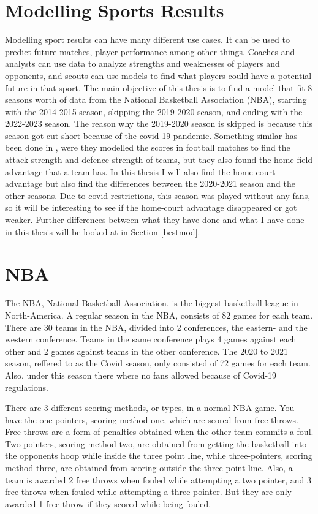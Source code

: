 
\section{Modelling Sports Results}

\noindent Modelling sport results can have many different use cases. It can be used to predict future matches, player performance among other things. Coaches and analysts can use data to analyze strengths and weaknesses of players and opponents, and scouts can use models to find what players could have a potential future in that sport. The main objective of this thesis is to find a model that fit 8 seasons worth of data from the National Basketball Association (NBA), starting with the 2014-2015 season, skipping the 2019-2020 season, and ending with the 2022-2023 season. The reason why the 2019-2020 season is skipped is because this season got cut short because of the covid-19-pandemic. Something similar has been done in \cite{fotballglmm}, were they modelled the scores in football matches to find the attack strength and defence strength of teams, but they also found the home-field advantage that a team has. In this thesis I will also find the home-court advantage but also find the differences between the 2020-2021 season and the other seasons. Due to covid restrictions, this season was played without any fans, so it will be interesting to see if the home-court advantage disappeared or got weaker. Further differences between what they have done and what I have done in this thesis will be looked at in Section \ref{bestmod}. \\

\newpage

\section{NBA}

\noindent The NBA, National Basketball Association, is the biggest basketball league in North-America. A regular season in the NBA, consists of 82 games for each team. There are 30 teams in the NBA, divided into 2 conferences, the eastern- and the western conference. Teams in the same conference plays 4 games against each other and 2 games against teams in the other conference. The 2020 to 2021 season, reffered to as the Covid season, only consisted of 72 games for each team. Also, under this season there where no fans allowed because of Covid-19 regulations.

There are 3 different scoring methods, or types, in a normal NBA game. You have the one-pointers, scoring method one, which are scored from free throws. Free throws are a form of penalties obtained when the other team commits a foul. Two-pointers, scoring method two, are obtained from getting the basketball into the opponents hoop while inside the three point line, while three-pointers, scoring method three, are obtained from scoring outside the three point line. Also, a team is awarded 2 free throws when fouled while attempting a two pointer, and 3 free throws when fouled while attempting a three pointer. But they are only awarded 1 free throw if they scored while being fouled.

